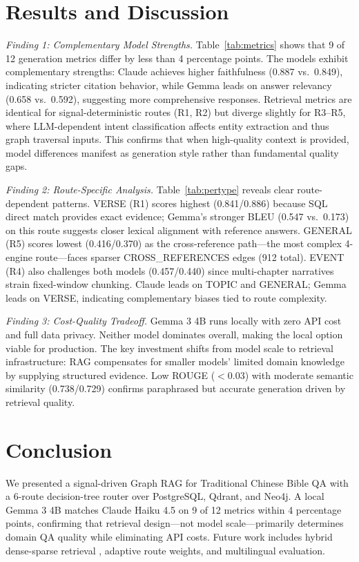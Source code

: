 \documentclass[10pt,conference,letterpaper]{IEEEtran}
\begin{document}
\section{Results and Discussion}

\textit{Finding 1: Complementary Model Strengths.}
Table~\ref{tab:metrics} shows that 9 of 12 generation metrics differ by less than 4 percentage points. The models exhibit complementary strengths: Claude achieves higher faithfulness (0.887 vs.\ 0.849), indicating stricter citation behavior, while Gemma leads on answer relevancy (0.658 vs.\ 0.592), suggesting more comprehensive responses. Retrieval metrics are identical for signal-deterministic routes (R1, R2) but diverge slightly for R3--R5, where LLM-dependent intent classification affects entity extraction and thus graph traversal inputs. This confirms that when high-quality context is provided, model differences manifest as generation style rather than fundamental quality gaps.

\textit{Finding 2: Route-Specific Analysis.}
Table~\ref{tab:pertype} reveals clear route-dependent patterns. VERSE (R1) scores highest (0.841/0.886) because SQL direct match provides exact evidence; Gemma's stronger BLEU (0.547 vs.\ 0.173) on this route suggests closer lexical alignment with reference answers. GENERAL (R5) scores lowest (0.416/0.370) as the cross-reference path---the most complex 4-engine route---faces sparser CROSS\_REFERENCES edges (912 total). EVENT (R4) also challenges both models (0.457/0.440) since multi-chapter narratives strain fixed-window chunking. Claude leads on TOPIC and GENERAL; Gemma leads on VERSE, indicating complementary biases tied to route complexity.

\textit{Finding 3: Cost-Quality Tradeoff.}
Gemma 3 4B runs locally with zero API cost and full data privacy. Neither model dominates overall, making the local option viable for production. The key investment shifts from model scale to retrieval infrastructure: RAG compensates for smaller models' limited domain knowledge by supplying structured evidence. Low ROUGE ($<$0.03) with moderate semantic similarity (0.738/0.729) confirms paraphrased but accurate generation driven by retrieval quality.

\section{Conclusion}

We presented a signal-driven Graph RAG for Traditional Chinese Bible QA with a 6-route decision-tree router over PostgreSQL, Qdrant, and Neo4j. A local Gemma 3 4B matches Claude Haiku 4.5 on 9 of 12 metrics within 4 percentage points, confirming that retrieval design---not model scale---primarily determines domain QA quality while eliminating API costs. Future work includes hybrid dense-sparse retrieval \cite{robertson2009}, adaptive route weights, and multilingual evaluation.
\end{document}
